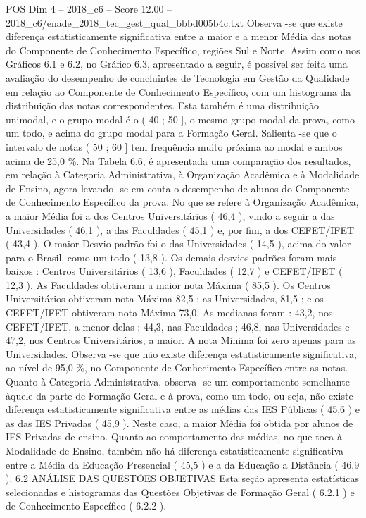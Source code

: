 \begin{textsample}{POS Dim 4 – 2018\_c6 – Score 12.00 – 2018\_c6/enade\_2018\_tec\_gest\_qual\_bbbd005b4c.txt}
Observa -se que existe diferença estatisticamente significativa entre a maior e a menor Média das notas do Componente de Conhecimento Específico, regiões Sul e Norte.
Assim como nos Gráficos 6.1 e 6.2, no Gráfico 6.3, apresentado a seguir, é possível ser feita uma avaliação do desempenho de concluintes de Tecnologia em Gestão da Qualidade em relação ao Componente de Conhecimento Específico, com um histograma da distribuição das notas correspondentes.
Esta também é uma distribuição unimodal, e o grupo modal é o ( 40 ; 50 ], o mesmo grupo modal da prova, como um todo, e acima do grupo modal para a Formação Geral.
Salienta -se que o intervalo de notas ( 50 ; 60 ] tem frequência muito próxima ao modal e ambos acima de 25,0 \%.
Na Tabela 6.6, é apresentada uma comparação dos resultados, em relação à Categoria Administrativa, à Organização Acadêmica e à Modalidade de Ensino, agora levando -se em conta o desempenho de alunos do Componente de Conhecimento Específico da prova.
No que se refere à Organização Acadêmica, a maior Média foi a dos Centros Universitários ( 46,4 ), vindo a seguir a das Universidades ( 46,1 ), a das Faculdades ( 45,1 ) e, por fim, a dos CEFET/IFET ( 43,4 ).
O maior Desvio padrão foi o das Universidades ( 14,5 ), acima do valor para o Brasil, como um todo ( 13,8 ).
Os demais desvios padrões foram mais baixos : Centros Universitários ( 13,6 ), Faculdades ( 12,7 ) e CEFET/IFET ( 12,3 ).
As Faculdades obtiveram a maior nota Máxima ( 85,5 ).
Os Centros Universitários obtiveram nota Máxima 82,5 ; as Universidades, 81,5 ; e os CEFET/IFET obtiveram nota Máxima 73,0.
As medianas foram : 43,2, nos CEFET/IFET, a menor delas ; 44,3, nas Faculdades ; 46,8, nas Universidades e 47,2, nos Centros Universitários, a maior.
A nota Mínima foi zero apenas para as Universidades.
Observa -se que não existe diferença estatisticamente significativa, ao nível de 95,0 \%, no Componente de Conhecimento Específico entre as notas.
Quanto à Categoria Administrativa, observa -se um comportamento semelhante àquele da parte de Formação Geral e à prova, como um todo, ou seja, não existe diferença estatisticamente significativa entre as médias das IES Públicas ( 45,6 ) e as das IES Privadas ( 45,9 ).
Neste caso, a maior Média foi obtida por alunos de IES Privadas de ensino.
Quanto ao comportamento das médias, no que toca à Modalidade de Ensino, também não há diferença estatisticamente significativa entre a Média da Educação Presencial ( 45,5 ) e a da Educação a Distância ( 46,9 ). 6.2 ANÁLISE DAS QUESTÕES OBJETIVAS Esta seção apresenta estatísticas selecionadas e histogramas das Questões Objetivas de Formação Geral ( 6.2.1 ) e de Conhecimento Específico ( 6.2.2 ).

\end{textsample}
